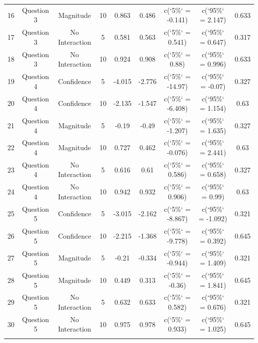 \begin{table}[!htbp]
\begin{tabular}{@{\extracolsep{5pt}} ccccccccc}
16 & Question 3 & Magnitude & 10 & 0.863 & 0.486 & c(`5\%` = -0.141) & c(`95\%` = 2.147) & 0.633 \\ 
17 & Question 3 & No Interaction & 5 & 0.581 & 0.563 & c(`5\%` = 0.541) & c(`95\%` = 0.647) & 0.317 \\ 
18 & Question 3 & No Interaction & 10 & 0.924 & 0.908 & c(`5\%` = 0.88) & c(`95\%` = 0.996) & 0.633 \\ 
19 & Question 4 & Confidence & 5 & -4.015 & -2.776 & c(`5\%` = -14.97) & c(`95\%` = -0.07) & 0.327 \\ 
20 & Question 4 & Confidence & 10 & -2.135 & -1.547 & c(`5\%` = -6.408) & c(`95\%` = 1.154) & 0.63 \\ 
21 & Question 4 & Magnitude & 5 & -0.19 & -0.49 & c(`5\%` = -1.207) & c(`95\%` = 1.635) & 0.327 \\ 
22 & Question 4 & Magnitude & 10 & 0.727 & 0.462 & c(`5\%` = -0.076) & c(`95\%` = 2.441) & 0.63 \\ 
23 & Question 4 & No Interaction & 5 & 0.616 & 0.61 & c(`5\%` = 0.586) & c(`95\%` = 0.658) & 0.327 \\ 
24 & Question 4 & No Interaction & 10 & 0.942 & 0.932 & c(`5\%` = 0.906) & c(`95\%` = 0.99) & 0.63 \\ 
25 & Question 5 & Confidence & 5 & -3.015 & -2.162 & c(`5\%` = -8.867) & c(`95\%` = -1.092) & 0.321 \\ 
26 & Question 5 & Confidence & 10 & -2.215 & -1.368 & c(`5\%` = -9.778) & c(`95\%` = 0.392) & 0.645 \\ 
27 & Question 5 & Magnitude & 5 & -0.21 & -0.334 & c(`5\%` = -0.944) & c(`95\%` = 1.409) & 0.321 \\ 
28 & Question 5 & Magnitude & 10 & 0.449 & 0.313 & c(`5\%` = -0.36) & c(`95\%` = 1.841) & 0.645 \\ 
29 & Question 5 & No Interaction & 5 & 0.632 & 0.633 & c(`5\%` = 0.582) & c(`95\%` = 0.676) & 0.321 \\ 
30 & Question 5 & No Interaction & 10 & 0.975 & 0.978 & c(`5\%` = 0.933) & c(`95\%` = 1.025) & 0.645 \\ 
\hline \\[-1.8ex] 
\end{tabular} 
\end{table} 
